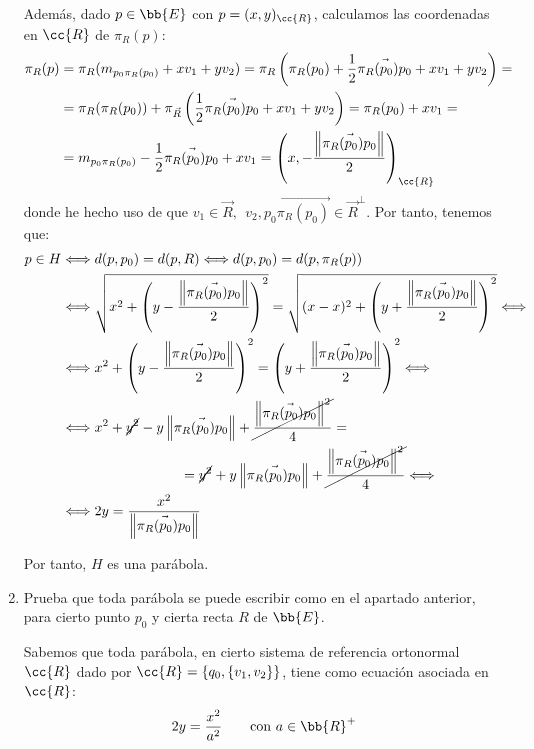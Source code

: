 \begin{ejercicio}
\begin{enumerate}
    Además, dado $ p\in \bb{E}$ con $p=(x,y)_{\cc{R}}$, calculamos las coordenadas en $\cc{R}$ de $\pi_R(p)$:
    \begin{align*}
        \pi_R(p) &= \pi_R(m_{p_0\pi_R(p_0)} + xv_1 + yv_2) = \pi_R\left(\pi_R(p_0) + \frac{1}{2}\vec{\pi_R(p_0)p_0} + xv_1 + yv_2\right)
        =\\&= \pi_R(\pi_R(p_0)) + \pi_{\vec{R}}\left(\frac{1}{2}\vec{\pi_R(p_0)p_0} + xv_1 + yv_2\right) = \pi_R(p_0) + xv_1
        =\\&= m_{p_0\pi_R(p_0)} -\frac{1}{2}\vec{\pi_R(p_0)p_0} + xv_1
        = \left(x, -\dfrac{\left\|\vec{\pi_R(p_0)p_0}\right\|}{2}\right)_{\cc{R}}
    \end{align*}
    donde he hecho uso de que $v_1\in \vec{R},~~v_2, \vec{p_0\pi_R(p_0)} \in \vec{R}^\perp$. Por tanto, tenemos que:
    \begin{align*}
        p\in H &\Longleftrightarrow
        d(p,p_0) = d(p,R) \Longleftrightarrow d(p, p_0) = d(p,\pi_R(p)) \\ & \Longleftrightarrow
        \sqrt{x^2 + \left(y-\frac{\left\|\vec{\pi_R(p_0)p_0}\right\|}{2}\right)^2} = \sqrt{(x-x)^2 + \left(y+\frac{\left\|\vec{\pi_R(p_0)p_0}\right\|}{2}\right)^2} \Longleftrightarrow \\ & \Longleftrightarrow
        x^2 + \left(y-\frac{\left\|\vec{\pi_R(p_0)p_0}\right\|}{2}\right)^2 = \left(y+\frac{\left\|\vec{\pi_R(p_0)p_0}\right\|}{2}\right)^2 \Longleftrightarrow \\ & \Longleftrightarrow
        x^2 + \cancel{y^2} - y\left\|\vec{\pi_R(p_0)p_0}\right\| + \cancel{\frac{\left\|\vec{\pi_R(p_0)p_0}\right\|^2}{4}} =\\&\hspace{3cm}=\cancel{y^2} + y\left\|\vec{\pi_R(p_0)p_0}\right\| + \cancel{\frac{\left\|\vec{\pi_R(p_0)p_0}\right\|^2}{4}} \Longleftrightarrow \\ & \Longleftrightarrow
        2y = \frac{x^2}{\left\|\vec{\pi_R(p_0)p_0}\right\|}
    \end{align*}

    Por tanto, $H$ es una parábola.

    \item Prueba que toda parábola se puede escribir como en el apartado anterior, para cierto punto $p_0$ y cierta recta $R$ de $\bb{E}$.
    
    Sabemos que toda parábola, en cierto sistema de referencia ortonormal $\cc{R}$ dado por $\cc{R}=\{q_0, \{v_1, v_2\}\}$, tiene como ecuación asociada en $\cc{R}$:
    \begin{equation*}
        2y = \frac{x^2}{a^2} \qquad \text{con } a\in \bb{R}^+
    \end{equation*}


\end{enumerate}
\end{ejercicio}
